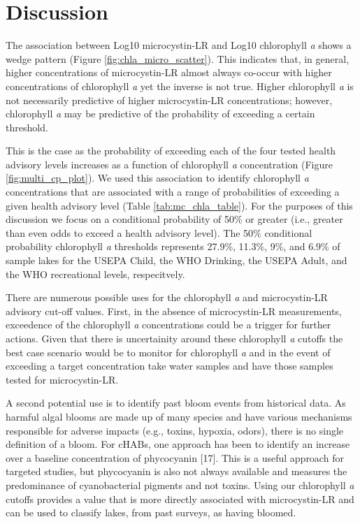 \documentclass[10pt,a4paper,twocolumn]{article}
\begin{document}
\section{Discussion}\label{discussion}

The association between Log10 microcystin-LR and Log10 chlorophyll
\emph{a} shows a wedge pattern (Figure \ref{fig:chla_micro_scatter}).
This indicates that, in general, higher concentrations of microcystin-LR
almost always co-occur with higher concentrations of chlorophyll
\emph{a} yet the inverse is not true. Higher chlorophyll \emph{a} is not
necessarily predictive of higher microcystin-LR concentrations; however,
chlorophyll \emph{a} may be predictive of the probability of exceeding a
certain threshold.

This is the case as the probability of exceeding each of the four tested
health advisory levels increases as a function of chlorophyll \emph{a}
concentration (Figure \ref{fig:multi_cp_plot}). We used this association
to identify chlorophyll \emph{a} concentrations that are associated with
a range of probabilities of exceeding a given health advisory level
(Table \ref{tab:mc_chla_table}). For the purposes of this discussion we
focus on a conditional probability of 50\% or greater (i.e., greater
than even odds to exceed a health advisory level). The 50\% conditional
probability chlorophyll \emph{a} thresholds represents 27.9\%, 11.3\%,
9\%, and 6.9\% of sample lakes for the USEPA Child, the WHO Drinking,
the USEPA Adult, and the WHO recreational levels, respecitvely.

There are numerous possible uses for the chlorophyll \emph{a} and
microcystin-LR advisory cut-off values. First, in the absence of
microcystin-LR measurements, exceedence of the chlorophyll \emph{a}
concentrations could be a trigger for further actions. Given that there
is uncertainity around these chlorophyll \emph{a} cutoffs the best case
scenario would be to monitor for chlorophyll \emph{a} and in the event
of exceeding a target concentration take water samples and have those
samples tested for microcystin-LR.

A second potential use is to identify past bloom events from historical
data. As harmful algal blooms are made up of many species and have
various mechanisms responsible for adverse impacts (e.g., toxins,
hypoxia, odors), there is no single definition of a bloom. For cHABs,
one approach has been to identify an increase over a baseline
concentration of phycocyanin {[}17{]}. This is a useful approach for
targeted studies, but phycocyanin is also not always available and
measures the predominance of cyanobacterial pigments and not toxins.
Using our chlorophyll \emph{a} cutoffs provides a value that is more
directly associated with microcystin-LR and can be used to classify
lakes, from past surveys, as having bloomed.
\end{document}
